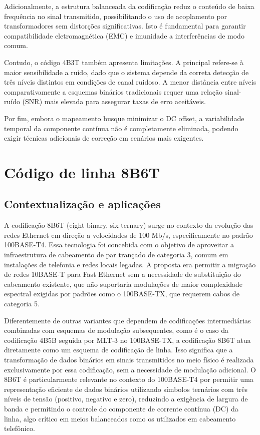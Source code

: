 \documentclass[conference]{IEEEtran}
\begin{document}
Adicionalmente, a estrutura balanceada da codificação reduz o conteúdo de baixa frequência no sinal transmitido, possibilitando o uso de acoplamento por transformadores sem distorções significativas. Isto é fundamental para garantir compatibilidade eletromagnética (EMC) e imunidade a interferências de modo comum.

Contudo, o código 4B3T também apresenta limitações. A principal refere-se à maior sensibilidade a ruído, dado que o sistema depende da correta detecção de três níveis distintos em condições de canal ruidoso. A menor distância entre níveis comparativamente a esquemas binários tradicionais requer uma relação sinal-ruído (SNR) mais elevada para assegurar taxas de erro aceitáveis.

Por fim, embora o mapeamento busque minimizar o DC offset, a variabilidade temporal da componente contínua não é completamente eliminada, podendo exigir técnicas adicionais de correção em cenários mais exigentes.

\section{Código de linha 8B6T}

\subsection{Contextualização e aplicações}

A codificação 8B6T (eight binary, six ternary) surge no contexto da evolução das redes Ethernet em direção a velocidades de 100 Mb/s, especificamente no padrão 100BASE-T4. Essa tecnologia foi concebida com o objetivo de aproveitar a infraestrutura de cabeamento de par trançado de categoria 3, comum em instalações de telefonia e redes locais legadas. A proposta era permitir a migração de redes 10BASE-T para Fast Ethernet sem a necessidade de substituição do cabeamento existente, que não suportaria modulações de maior complexidade espectral exigidas por padrões como o 100BASE-TX, que requerem cabos de categoria 5.

Diferentemente de outras variantes que dependem de codificações intermediárias combinadas com esquemas de modulação subsequentes, como é o caso da codificação 4B5B seguida por MLT-3 no 100BASE-TX, a codificação 8B6T atua diretamente como um esquema de codificação de linha. Isso significa que a transformação de dados binários em sinais transmitidos no meio físico é realizada exclusivamente por essa codificação, sem a necessidade de modulação adicional. O 8B6T é particularmente relevante no contexto do 100BASE-T4 por permitir uma representação eficiente de dados binários utilizando símbolos ternários com três níveis de tensão (positivo, negativo e zero), reduzindo a exigência de largura de banda e permitindo o controle do componente de corrente contínua (DC) da linha, algo crítico em meios balanceados como os utilizados em cabeamento telefônico.
\end{document}
